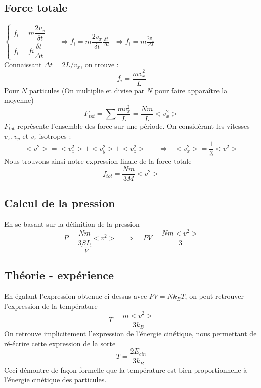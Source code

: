 \documentclass	[11pt, a4paper, openany]{book}
\begin{document}
\subsection{Force totale}
$\left\{\begin{array}{l}
f_i = m\dfrac{2v_x}{\delta t}\\
\overline{f_i} = fi\dfrac{\delta t}{\Delta t}
\end{array}\right.$\ \ \ $\Rightarrow \overline{f_i} = m\dfrac{2v_x}{\delta t}\frac{\delta t}{\Delta t}\ \ \ \Rightarrow \overline{f_i} = m\frac{2v_x}{\Delta t}$\\
Connaissant $\Delta t = 2L/v_x$, on trouve : 
\begin{equation}
\overline{f_i} = \frac{mv_x^2}{L}
\end{equation}
Pour $N$ particules (On multiplie et divise par $N$ pour faire apparaître la moyenne)
\begin{equation}
F_{tot} = \sum \frac{mv_x^2}{L} = \frac{Nm}{L}<v_x^2>
\end{equation}
$F_{tot}$ représente l'ensemble des force sur une période. On considérant les vitesses $v_x, v_y$ et $v_z$ isotropes :
\begin{equation}
<v^2> = <v_x^2> + <v_y^2> + <v_z^2>\ \ \ \ \ \ \ \ \Rightarrow \ \ \ <v_x^2> = \frac{1}{3}<v^2>
\end{equation}
Nous trouvons ainsi notre expression finale de la force totale 
\begin{equation}
f_{tot} = \frac{Nm}{3M}<v^2>
\end{equation}
\subsection{Calcul de la pression}
En se basant sur la définition de la pression
\begin{equation}
P = \frac{Nm}{3\underbrace{SL}_V}<v^2>\ \ \ \ \ \Rightarrow \ \ \ \ \ PV = \frac{Nm<v^2>}{3}
\end{equation}
\subsection{Théorie - expérience}
En égalant l'expression obtenue ci-dessus avec $PV = Nk_BT$, on peut retrouver l'expression de la température
\begin{equation}
T = \frac{m<v^2>}{3k_B}
\end{equation}
On retrouve implicitement l'expression de l'énergie cinétique, nous permettant de ré-écrire cette expression de la sorte
\begin{equation}
T = \frac{2E_{cin}}{3k_B}
\end{equation}
Ceci démontre de façon formelle que la température est bien proportionnelle à l'énergie cinétique des particules.
\end{document}
